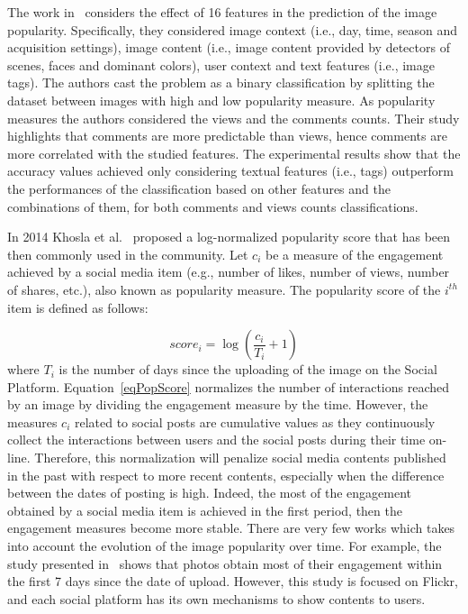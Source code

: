 The work in~\cite{mcparlane2014nobody} considers the effect of 16 features in the prediction of the image popularity. Specifically, they considered image context (i.e., day, time, season and acquisition settings), image content (i.e., image content provided by detectors of scenes, faces and dominant colors), user context and text features (i.e., image tags).
The authors cast the problem as a binary classification by splitting the dataset between images with high and low popularity measure.
As popularity measures the authors considered the views and the comments counts. Their study highlights that comments are more predictable than views, hence comments are more correlated with the studied features. 
The experimental results show that the accuracy values achieved only considering textual features (i.e., tags) outperform the performances of the classification based on other features and the combinations of them, for both comments and views counts classifications.


In 2014 Khosla et al.~\cite{khosla2014makes} proposed a log-normalized popularity score that has been then commonly used in the community. Let $c_i$ be a measure of the engagement achieved by a social media item (e.g., number of likes, number of views, number of shares, etc.), also known as popularity measure. The popularity score of the $i^{th}$ item is defined as follows:

\begin{equation}\label{eqPopScore}
score_i = \log \left ( \frac{c_i}{T_i} + 1 \right )
\end{equation}
where $T_i$ is the number of days since the uploading of the image on the Social Platform. 
Equation~\ref{eqPopScore} normalizes the number of interactions reached by an image by dividing the engagement measure by the time.
However, the measures $c_i$ related to social posts are cumulative values as they continuously collect the interactions between users and the social posts during their time on-line. Therefore, this normalization will penalize social media contents published in the past with respect to more recent contents, especially when the difference between the dates of posting is high. Indeed, the most of the engagement obtained by a social media item is achieved in the first period, then the engagement measures become more stable. There are very few works which takes into account the evolution of the image popularity over time. For example, the study presented in~\cite{valafar2009beyond} shows that photos obtain most of their engagement within the first 7 days since the date of upload. However, this study is focused on Flickr, and each social platform has its own mechanisms to show contents to users.

